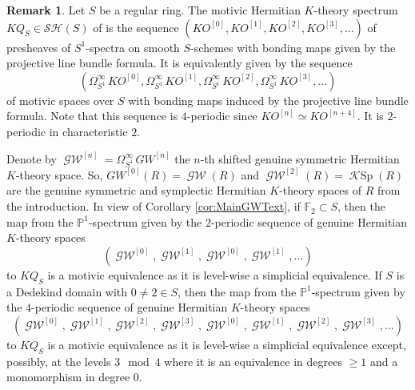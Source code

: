 \documentclass[10pt,twoside,a4paper,reqno]{amsart}
\theoremstyle{definition}
\newtheorem{remark}[theorem]{Remark}
\numberwithin{equation}{section}
\newcommand{\ppp}{\mathbb{P}}
\newcommand{\GW}{\operatorname{\mathcal{GW}}}
\newcommand{\KSp}{\operatorname{\mathcal{K}Sp}}
\newcommand{\F}{\mathbb{F}}
\renewcommand{\|}{\operatorname{|}}
\begin{document}
\begin{remark}
\label{rmk:motivicRep}
Let $S$ be a regular ring.
The motivic Hermitian $K$-theory spectrum $KQ _S\in \mathcal{SH}(S)$ of \cite{CHN} is the sequence $(KO^{[0]}, KO^{[1]}, KO^{[2]}, KO^{[3]}, ...)$ of presheaves of $S^1$-spectra on smooth $S$-schemes with bonding maps given by the projective line bundle formula.
It is equivalently given by the sequence 
$$(\Omega^{\infty}_{S^1}\, KO^{[0]}, \Omega^{\infty}_{S^1}\, KO^{[1]}, \Omega^{\infty}_{S^1}\, KO^{[2]}, \Omega^{\infty}_{S^1}\, KO^{[3]}, ...)$$ 
of motivic spaces over $S$ with bonding maps induced by the projective line bundle formula.
Note that this sequence is $4$-periodic since $KO^{[n]}\simeq KO^{[n+4]}$.
It is $2$-periodic in characteristic $2$.

Denote by $\GW^{[n]}=\Omega^{\infty}_{S^1}\, GW^{[n]}$ the $n$-th shifted genuine symmetric Hermitian $K$-theory space.
So, $GW^{[0]}(R)=\GW(R)$ and $\GW^{[2]}(R)=\KSp(R)$ are the genuine symmetric and symplectic Hermitian $K$-theory spaces of $R$ from the introduction.
In view of Corollary \ref{cor:MainGWText}, if $\F_2 \subset S$, then the map from the  $\ppp^1$-spectrum given by the $2$-periodic sequence of genuine Hermitian $K$-theory spaces
$$(\GW^{[0]}, \GW^{[1]}, \GW^{[0]}, \GW^{[1]}, ... )$$
to $KQ_S$ is a motivic equivalence as it is level-wise a simplicial equivalence.
If $S$ is a Dedekind domain with $0\neq 2\in S$, then 
the map from the $\ppp^1$-spectrum given by the $4$-periodic sequence of genuine Hermitian $K$-theory spaces
\begin{equation}
\label{eq:rmk:motivicRep}
(\GW^{[0]}, \GW^{[1]}, \GW^{[2]}, \GW^{[3]}, \GW^{[0]}, \GW^{[1]}, \GW^{[2]}, \GW^{[3]}, ... )
\end{equation}
to $KQ_S$ is a motivic equivalence as it is level-wise a simplicial equivalence except, possibly, at the levels $3\mod 4$ where it is an equivalence in degrees $\geq 1$ and a monomorphism in degree $0$.
\end{remark}


%
\end{document}
